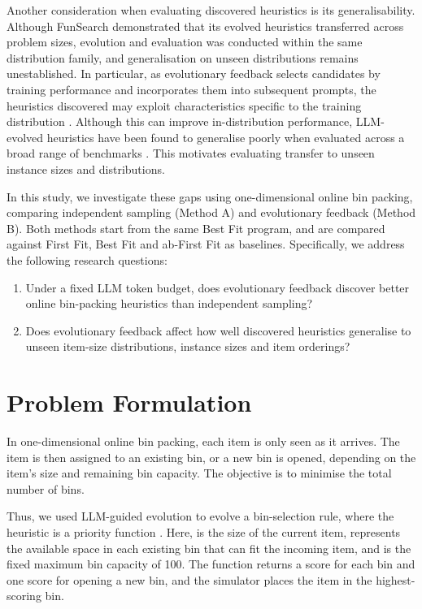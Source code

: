 \documentclass[12pt]{article}
\begin{document}
Another consideration when evaluating discovered heuristics is its generalisability. Although FunSearch demonstrated that its evolved heuristics transferred across problem sizes, evolution and evaluation was conducted within the same distribution family, and generalisation on unseen distributions remains unestablished. In particular, as evolutionary feedback selects candidates by training performance and incorporates them into subsequent prompts, the heuristics discovered may exploit characteristics specific to the training distribution \citep{huang2025}. Although this can improve in-distribution performance, LLM-evolved heuristics have been found to generalise poorly when evaluated across a broad range of benchmarks \citep{sim2025}. This motivates evaluating transfer to unseen instance sizes and distributions.

In this study, we investigate these gaps using one-dimensional online bin packing, comparing independent sampling (Method A) and evolutionary feedback (Method B). Both methods start from the same Best Fit program, and are compared against First Fit, Best Fit and ab-First Fit as baselines. Specifically, we address the following research questions:
\begin{enumerate}\item Under a fixed LLM token budget, does evolutionary feedback discover better online bin-packing heuristics than independent sampling?
\item Does evolutionary feedback affect how well discovered heuristics generalise to unseen item-size distributions, instance sizes and item orderings?\end{enumerate}



\section{Problem Formulation}

In one-dimensional online bin packing, each item is only
seen as it arrives. The item is then assigned to an
existing bin, or a new bin is opened, depending on the
item's size and remaining bin capacity. The objective
is to minimise the total number of bins.

Thus, we used LLM-guided evolution to evolve a
bin-selection rule, where the heuristic is a priority
function .
Here,  is the size of the current
item, 
represents the available space in each existing bin
that can fit the incoming item, and 
is the fixed maximum bin capacity of 100.
The function returns a score for each bin and one
score for opening a new bin, and the simulator
places the item in the highest-scoring bin.
\end{document}

